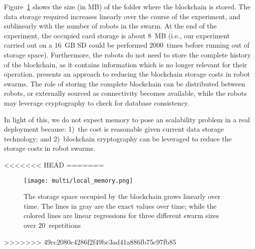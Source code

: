 \documentclass[runningheads]{llncs}
\begin{document}
Figure~\ref{fig:data-storage} shows the size (in MB) of the folder where the blockchain is stored. The data storage required increases linearly over the course of the experiment, and sublinearly with the number of robots in the swarm. At the end of the experiment, the occupied card storage is about $8$~MB (i.e., our experiment carried out on a $16$~GB SD could be performed $2000$~times before running out of storage space). Furthermore, the robots do not need to store the complete history of the blockchain, as it contains information which is no longer relevant for their operation. \cite{nishida_suppressing_2018} presents an approach to reducing the blockchain storage costs in robot swarms. The role of storing the complete blockchain can be distributed between robots, or externally sourced as connectivity becomes available, while the robots may leverage cryptography to check for database consistency.

In light of this, we do not expect memory to pose an scalability problem in a real deployment because: 1)~the cost is reasonable given current data storage technology; and 2)~blockchain cryptography can be leveraged to reduce the storage costs in robot swarms.

<<<<<<< HEAD
=======
\begin{figure}
    \begin{minipage}[c]{0.5\textwidth}
        \texttt{[image: multi/local\_memory.png]}
    \end{minipage}\hfill
    \begin{minipage}[c]{0.48\textwidth}
        \caption{The storage space occupied by the blockchain grows linearly over time. The lines in gray are the exact values over time; while the colored lines are linear regressions for three different swarm sizes over $20$~repetitions} 
        \label{fig:data-storage}
    \end{minipage}
\end{figure}
>>>>>>> 49cc2080c4286f2f49bc3ad41a886fb75c97fb85




\end{document}
